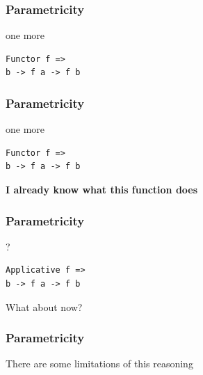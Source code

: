 \begin{frame}[fragile]
\frametitle{Parametricity}
\begin{block}{one more}
\begin{lstlisting}
Functor f =>
b -> f a -> f b
\end{lstlisting}
\end{block}
\end{frame}

\begin{frame}[fragile]
\frametitle{Parametricity}
\begin{block}{one more}
\begin{lstlisting}
Functor f =>
b -> f a -> f b
\end{lstlisting}
\end{block}
\textbf{I already know what this function does}
\end{frame}

\begin{frame}[fragile]
\frametitle{Parametricity}
\begin{block}{?}
\begin{lstlisting}
Applicative f =>
b -> f a -> f b
\end{lstlisting}
\end{block}
What about now?
\end{frame}

\begin{frame}[fragile]
\frametitle{Parametricity}
\begin{center}
There are some limitations of this reasoning
\end{center}
\end{frame}
